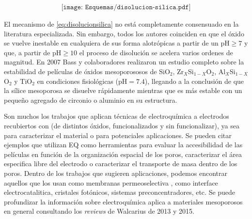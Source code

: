 			\begin{equation}
				\begin{aligned}
				\texttt{[image: Esquemas/disolucion-silica.pdf]}
				\label{eq:disolucionsilica}
				\end{aligned}
				\end{equation} 
	
	El mecanismo de \ref{eq:disolucionsilica} no está completamente consensuado en la literatura especializada. Sin embargo, todos los autores coinciden en que el óxido se vuelve inestable en cualquiera de sus forma alotrópicas a partir de un $\text{pH}\geq7$ y que, a partir de $\text{pH}\geq10$ el proceso de disolución se acelera varios ordenes de magnitud.\cite{Kosmulski2002,Kosmulski2014,Schwarz1984,Si-HanWu2013,iler1979} En 2007 Bass y colaboradores\cite{bass2007} realizaron un estudio completo sobre la estabilidad de películas de óxidos mesoporososos de SiO$_2$, Zr$_X$Si$_{1-X}$O$_2$, Al$_X$Si$_{1-X}$O$_2$ y TiO$_2$ en condiciones fisiológicas (pH$=7.4$), llegando a la conclusión de que la sílice mesoporosa se disuelve rápidamente mientras que es más estable con un pequeño agregado de circonio o aluminio en su estructura.


	Son muchos los trabajos que aplican técnicas de electroquímica a electrodos recubiertos con \pdm\space (de distintos óxidos, funcionalizados y sin funcionalizar), ya sea para caracterizar el material o para potenciales aplicaciones. Se pueden citar ejemplos que utilizan EQ como herramientas para evaluar la accesibilidad de las películas en función de la organización espacial de los poros\cite{Etienne2007,Herzog2013}, caracterizar el área especifica libre del electrodo \cite{Otal2006} o caracterizar el transporte de masa dentro de los poros\cite{Calvo2009,brunsen2011}. Dentro de los trabajos que sugieren aplicaciones, podemos encontrar aquellos que los usan como membranas permeoselectiva \cite{Fattakhova-Rohlfing2007,Andrieu-Brunsen2015,Calvo2009}, como interface electrocatalitica\cite{BaeJ.HanJ.Chung2012}, cristales fotónicos\cite{Gimenez2017}, sistemas preconcentradores\cite{Etienne2015,Gimenez2016-2}, etc. Se puede profundizar la información sobre electroquímica aplica a materiales mesoporosos en general consultando los \textit{reviews} de Walcarius de 2013\cite{walcarius2013,Etienne2013} y 2015\cite{Etienne2015}.


